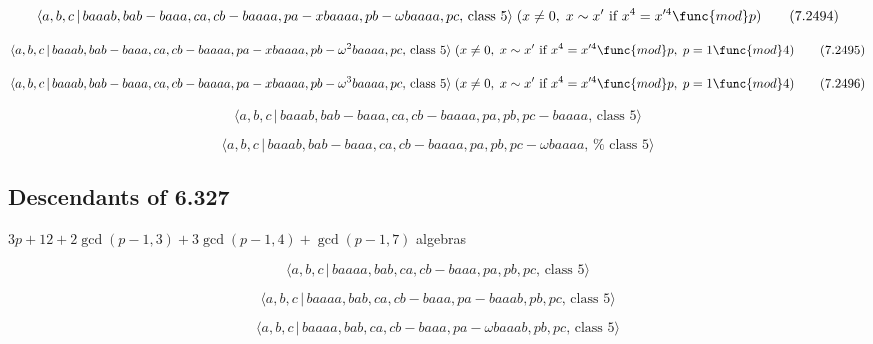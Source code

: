\documentclass[10pt]{article}
\begin{document}
\begin{equation}
\langle a,b,c\,|\,baaab,bab-baaa,ca,cb-baaaa,pa-xbaaaa,pb-\omega baaaa,pc,\,%
\text{class }5\rangle \;(x\neq 0,\;x\sim x^{\prime }\text{ if }%
x^{4}=x^{\prime 4}\func{mod}p)  \tag{7.2494}
\end{equation}

\begin{equation}
\langle a,b,c\,|\,baaab,bab-baaa,ca,cb-baaaa,pa-xbaaaa,pb-\omega
^{2}baaaa,pc,\,\text{class }5\rangle \;(x\neq 0,\;x\sim x^{\prime }\text{ if 
}x^{4}=x^{\prime 4}\func{mod}p,\;p=1\func{mod}4)  \tag{7.2495}
\end{equation}

\begin{equation}
\langle a,b,c\,|\,baaab,bab-baaa,ca,cb-baaaa,pa-xbaaaa,pb-\omega
^{3}baaaa,pc,\,\text{class }5\rangle \;(x\neq 0,\;x\sim x^{\prime }\text{ if 
}x^{4}=x^{\prime 4}\func{mod}p,\;p=1\func{mod}4)  \tag{7.2496}
\end{equation}

\begin{equation}
\langle a,b,c\,|\,baaab,bab-baaa,ca,cb-baaaa,pa,pb,pc-baaaa,\,\text{class }%
5\rangle  \tag{7.2497}
\end{equation}

\begin{equation}
\langle a,b,c\,|\,baaab,bab-baaa,ca,cb-baaaa,pa,pb,pc-\omega baaaa,\,\text{%
class }5\rangle  \tag{7.2498}
\end{equation}

\subsection{Descendants of 6.327}

$3p+12+2\gcd (p-1,3)+3\gcd (p-1,4)+\gcd (p-1,7)$ algebras

\begin{equation}
\langle a,b,c\,|\,baaaa,bab,ca,cb-baaa,pa,pb,pc,\,\text{class }5\rangle 
\tag{7.2499}
\end{equation}

\begin{equation}
\langle a,b,c\,|\,baaaa,bab,ca,cb-baaa,pa-baaab,pb,pc,\,\text{class }5\rangle
\tag{7.2500}
\end{equation}

\begin{equation}
\langle a,b,c\,|\,baaaa,bab,ca,cb-baaa,pa-\omega baaab,pb,pc,\,\text{class }%
5\rangle  \tag{7.2501}
\end{equation}
\end{document}
